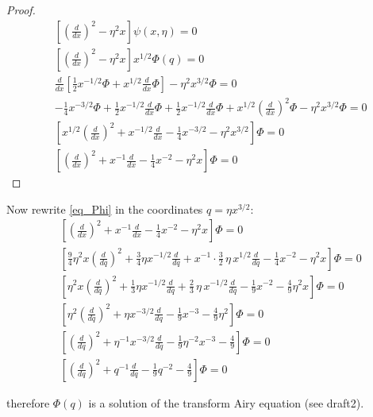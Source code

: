 \documentclass{article}
\theoremstyle{definition}
\theoremstyle{plain}
\begin{document}
\begin{proof}
\begin{align*}
&\left[\left(\frac{d}{dx}\right)^2 - \eta^2 x \right] \psi(x, \eta) = 0\\
&\left[\left(\frac{d}{dx}\right)^2 - \eta^2 x \right] x^{1/2}\Phi(q) = 0\\
&\frac{d}{dx}\left[\frac{1}{2}x^{-1/2}\Phi+x^{1/2}\frac{d}{dx}\Phi\right]-\eta^2x^{3/2}\Phi=0\\
&-\frac{1}{4}x^{-3/2}\Phi+\frac{1}{2}x^{-1/2}\frac{d}{dx}\Phi+\frac{1}{2}x^{-1/2}\frac{d}{dx}\Phi+x^{1/2}\left(\frac{d}{dx}\right)^2\Phi-\eta^2x^{3/2}\Phi=0\\
&\left[x^{1/2}\left(\frac{d}{dx}\right)^2+x^{-1/2}\frac{d}{dx}-\frac{1}{4}x^{-3/2}-\eta^2x^{3/2}\right]\Phi=0\\
&\left[\left(\frac{d}{dx}\right)^2+x^{-1}\frac{d}{dx}-\frac{1}{4}x^{-2}-\eta^2x\right]\Phi=0
\end{align*}
\end{proof}
Now rewrite \eqref{eq_Phi} in the coordinates $q=\eta x^{3/2}$: 
\begin{align*}
&\left[\left(\frac{d}{dx}\right)^2+x^{-1}\frac{d}{dx}-\frac{1}{4}x^{-2}-\eta^2x\right]\Phi=0\\
&\left[\frac{9}{4}\eta^2x\left(\frac{d}{dq}\right)^2+\frac{3}{4}\eta x^{-1/2}\frac{d}{dq}+x^{-1}\cdot\frac{3}{2}\, \eta\,  x^{1/2}\frac{d}{dq}-\frac{1}{4}x^{-2}-\eta^2x\right]\Phi=0\\
&\left[\eta^2x\left(\frac{d}{dq}\right)^2+\frac{1}{3}\eta x^{-1/2}\frac{d}{dq}+\frac{2}{3}\, \eta\,  x^{-1/2}\frac{d}{dq}-\frac{1}{9}x^{-2}-\frac{4}{9}\eta^2x\right]\Phi=0\\
&\left[\eta^2\left(\frac{d}{dq}\right)^2+\eta x^{-3/2}\frac{d}{dq}-\frac{1}{9}x^{-3}-\frac{4}{9}\eta^2\right]\Phi=0\\
&\left[\left(\frac{d}{dq}\right)^2+\eta^{-1} x^{-3/2}\frac{d}{dq}-\frac{1}{9}\eta^{-2}x^{-3}-\frac{4}{9}\right]\Phi=0\\
&\left[\left(\frac{d}{dq}\right)^2+q^{-1}\frac{d}{dq}-\frac{1}{9}q^{-2}-\frac{4}{9}\right]\Phi=0
\end{align*}

therefore $\Phi(q)$ is a solution of the transform Airy equation (see draft2).  

%
%
%
\end{document}
